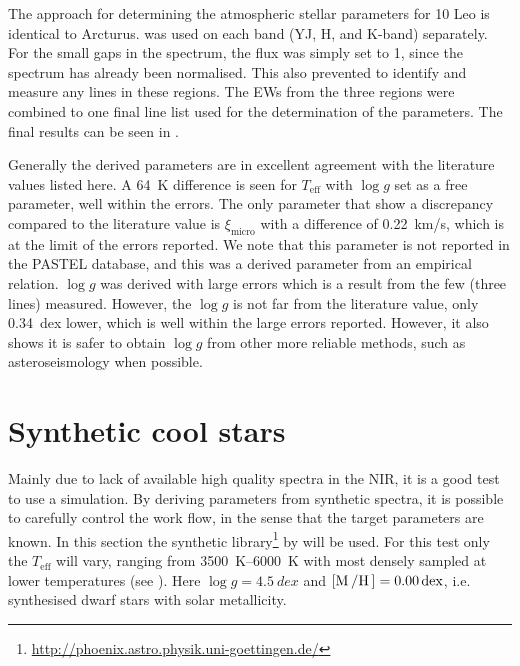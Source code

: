 The approach for determining the atmospheric stellar parameters for 10 Leo is identical to Arcturus.
 was used on each band (YJ, H, and K-band) separately. For the small gaps in the
spectrum, the flux was simply set to 1, since the spectrum has already been normalised. This also
prevented  to identify and measure any lines in these regions. The EWs from the three
regions were combined to one final line list used for the determination of the parameters. The final
results can be seen in .

Generally the derived parameters are in excellent agreement with the literature values listed here.
A \SI{64}{K} difference is seen for $T_\mathrm{eff}$ with $\log g$ set as a free parameter, well
within the errors. The only parameter that show a discrepancy compared to the literature value is
$\xi_\mathrm{micro}$ with a difference of \SI{0.22}{km/s}, which is at the limit of the errors
reported. We note that this parameter is not reported in the PASTEL database, and this was a derived parameter from an empirical relation. $\log g$
was derived with large errors which is a result from the few  (three lines) measured.
However, the $\log g$ is not far from the literature value, only \SI{0.34}{dex} lower, which is well
within the large errors reported. However, it also shows it is safer to obtain $\log g$ from other
more reliable methods, such as asteroseismology when possible.


\section{Synthetic cool stars}
\label{sec:synthetic_spectra}

Mainly due to lack of available high quality spectra in the NIR, it is a good test to use a
simulation. By deriving parameters from synthetic spectra, it is possible to carefully control the
work flow, in the sense that the target parameters are known. In this section the synthetic
library\footnote{\url{http://phoenix.astro.physik.uni-goettingen.de/}} by \citet{Husser2013} will be
used. For this test only the $T_\mathrm{eff}$ will vary, ranging from \SIrange{3500}{6000}{K} with
most densely sampled at lower temperatures (see ). Here $\log
g=\SI{4.5}{dex}$ and $[\ion{M}/\ion{H}]=\SI{0.00}{dex}$, i.e. synthesised dwarf stars with solar
metallicity.

